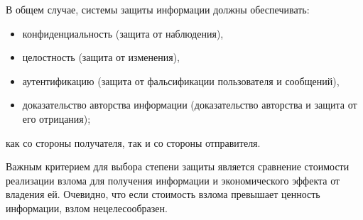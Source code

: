 В общем случае, системы защиты информации должны обеспечивать:
\begin{itemize}
    \item конфиденциальность (защита от наблюдения),
    \item целостность (защита от изменения),
    \item аутентификацию (защита от фальсификации пользователя и сообщений),
    \item доказательство авторства информации (доказательство авторства и защита от его отрицания);
\end{itemize}
как со стороны получателя, так и со стороны отправителя.

Важным критерием для выбора степени защиты является сравнение стоимости реализации взлома для получения информации и экономического эффекта от владения ей. Очевидно, что если стоимость взлома превышает ценность информации, взлом нецелесообразен.

